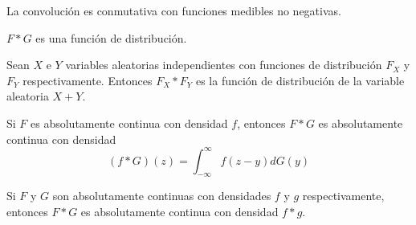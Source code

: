\begin{note}
    La convolución es conmutativa con funciones medibles no negativas.
\end{note}

\begin{proposition}
    $F \ast G$ es una función de distribución.
\end{proposition}

\begin{theorem}
    Sean $X$ e $Y$ variables aleatorias independientes con funciones de distribución $F_X$ y $F_Y$ respectivamente.
    Entonces $F_X \ast F_Y$ es la función de distribución de la variable aleatoria $X+Y$.
\end{theorem}

\begin{theorem}
    Si $F$ es absolutamente continua con densidad $f$, entonces $F \ast G$ es absolutamente continua con densidad
    $$(f \ast G)(z) = \int_{-\infty}^\infty f(z-y)dG(y)$$
\end{theorem}

\begin{theorem}
    Si $F$ y $G$ son absolutamente continuas con densidades $f$ y $g$ respectivamente, entonces $F \ast G$ es absolutamente continua con densidad $f \ast g$.
\end{theorem}

